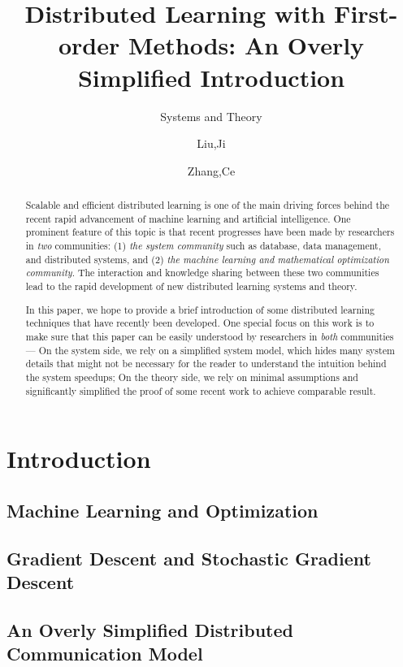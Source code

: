 \documentclass[examplefnt,biber]{nowfnt}
\title{Distributed Learning with
First-order Methods: An Overly Simplified  Introduction}
\subtitle{Systems and Theory}
\author[1]{Liu,Ji}
\author[2]{Zhang,Ce}
\affil[1]{XXX;email}
\affil[2]{ETH Zurich; ce.zhang@inf.ethz.ch}
\begin{document}
\makeabstracttitle

\begin{abstract}
Scalable and efficient distributed learning
is one of the main driving forces behind
the recent rapid advancement of machine learning and artificial intelligence. One prominent feature of this
topic is that recent progresses have been
made by researchers in {\em two} communities:
(1) {\em the system community} such as database,
data management, and distributed systems, and
(2) {\em the machine learning and
mathematical optimization community}. 
The interaction and knowledge sharing
between these two communities lead to the
rapid development of new distributed learning
systems and theory.

In this paper, we hope to provide a 
brief introduction of some distributed
learning techniques that have recently
been developed. One special focus on this
work is to make sure that this paper can
be easily understood by researchers
in {\em both} communities --- On the system
side, we rely on a simplified system model,
which hides many system details that might
not be necessary for the reader to understand
the intuition behind the system speedups;
On the theory side, we rely on minimal 
assumptions and significantly 
simplified the proof of some recent work
to achieve comparable result. 
\end{abstract}

\chapter{Introduction}

\section{Machine Learning and
Optimization}

\section{Gradient Descent 
and Stochastic Gradient Descent}


\section{An Overly Simplified Distributed Communication Model}

\label{sec:commmodel}


\end{document}
